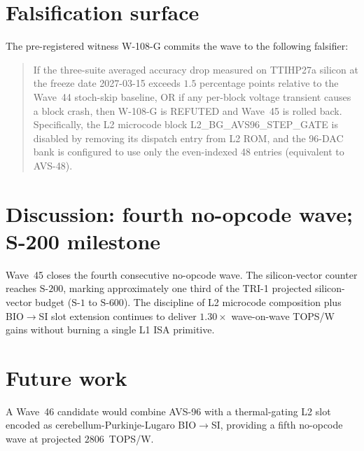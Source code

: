 \section{Falsification surface}

The pre-registered witness W-108-G commits the wave to the following
falsifier:

\begin{quote}
If the three-suite averaged accuracy drop measured on TTIHP27a silicon
at the freeze date 2027-03-15 exceeds $1.5$ percentage points relative
to the Wave~44 stoch-skip baseline, OR if any per-block voltage
transient causes a block crash, then W-108-G is REFUTED and Wave~45 is
rolled back. Specifically, the L2 microcode block
\textsc{L2\_BG\_AVS96\_STEP\_GATE} is disabled by removing its dispatch
entry from L2 ROM, and the 96-DAC bank is configured to use only the
even-indexed 48 entries (equivalent to AVS-48).
\end{quote}

\section{Discussion: fourth no-opcode wave; S-200 milestone}

Wave~45 closes the fourth consecutive no-opcode wave. The silicon-vector
counter reaches $\mathrm{S\text{-}200}$, marking approximately one third
of the TRI-1 projected silicon-vector budget ($\mathrm{S\text{-}1}$ to
$\mathrm{S\text{-}600}$). The discipline of L2 microcode composition
plus BIO$\to$SI slot extension continues to deliver $1.30\times$
wave-on-wave TOPS/W gains without burning a single L1 ISA primitive.

\section{Future work}

A Wave~46 candidate would combine AVS-96 with a thermal-gating L2 slot
encoded as cerebellum-Purkinje-Lugaro BIO$\to$SI, providing a fifth
no-opcode wave at projected $2806$~TOPS/W.


